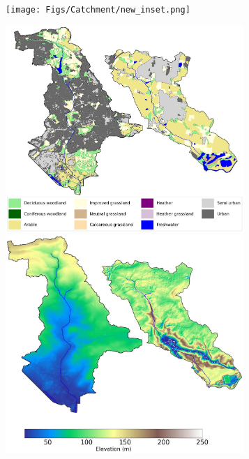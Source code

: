 \documentclass[APA,Times2COL]{WileyNJDv5}
\begin{document}
\begin{figure}[htbp!]
\centering
\begin{subfigure}[b]{.65\textwidth}
\texttt{[image: Figs/Catchment/new\_inset.png]}
\end{subfigure}\qquad
\begin{subfigure}[b]{.3\textwidth}
\includegraphics[width=0.99\textwidth]{Figs/Catchment/LandCover_BothCatchments.jpg}
  \newline
\includegraphics[width=0.99\textwidth]{Figs/Catchment/Terrain_BothCatchments.jpg}\llap{
}
\end{subfigure}
\end{figure}
\end{document}
